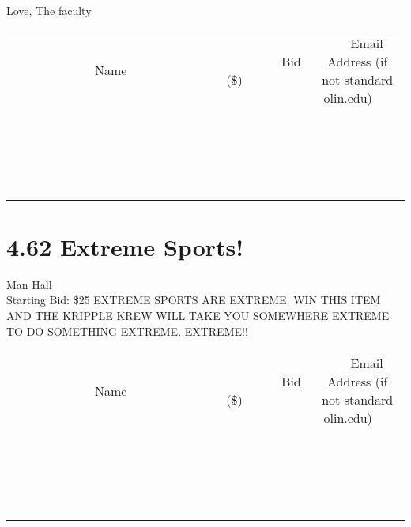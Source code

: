 \documentclass[11pt]{article}
\begin{document}
Love,
The faculty
\\[3ex]
\begin{tabular}{c c c}
~~~~~~~~~~~~~Name~~~~~~~~~~~~~ & ~~~~~~~~~Bid (\$)~~~~~~~~~  & ~~~Email Address (if not standard olin.edu)~~~\\
 & & \\
\hline
 & & \\
\hline
 & & \\
\hline
 & & \\
\hline
 & & \\
\hline
 & & \\
\hline
 & & \\
\hline
 & & \\
\hline
 & & \\
\hline
 & & \\
\hline
 & & \\
\hline
 & & \\
\hline
 & & \\
\hline
 & & \\
\hline
 & & \\
\hline
 & & \\
\hline
 & & \\
\hline
 & & \\
\hline
 & & \\
\hline
\end{tabular}
\newpage
\section*{4.62 Extreme Sports!}
Man Hall
\\
Starting Bid: \$25
\newline
EXTREME SPORTS ARE EXTREME. WIN THIS ITEM AND THE KRIPPLE KREW WILL TAKE YOU SOMEWHERE EXTREME TO DO SOMETHING EXTREME. EXTREME!!
\\[3ex]
\begin{tabular}{c c c}
~~~~~~~~~~~~~Name~~~~~~~~~~~~~ & ~~~~~~~~~Bid (\$)~~~~~~~~~  & ~~~Email Address (if not standard olin.edu)~~~\\
 & & \\
\hline
 & & \\
\hline
 & & \\
\hline
 & & \\
\hline
 & & \\
\hline
 & & \\
\hline
 & & \\
\hline
 & & \\
\hline
 & & \\
\hline
 & & \\
\hline
 & & \\
\hline
 & & \\
\hline
 & & \\
\hline
 & & \\
\hline
 & & \\
\hline
 & & \\
\hline
 & & \\
\hline
 & & \\
\hline
 & & \\
\hline
\end{tabular}
\newpage
\end{document}
